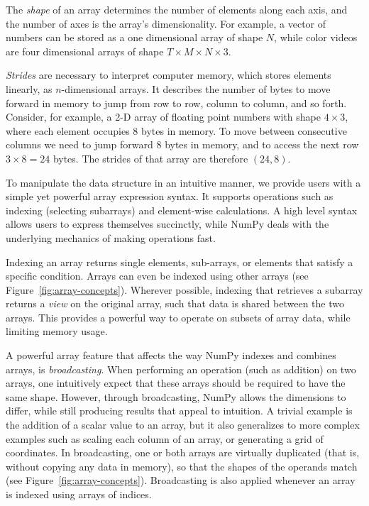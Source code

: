 The {\em shape} of an array determines the number of elements along each axis, and the number of axes is the array's dimensionality. For example, a vector of numbers can be stored as a one dimensional array of shape $N$, while color videos are four dimensional arrays of shape $T \times M \times N \times 3$.

{\em Strides} are necessary to interpret computer memory, which stores elements linearly, as $n$-dimensional arrays.  It describes the number of bytes to move forward in memory to jump from row to row, column to column, and so forth.  Consider, for example, a 2-D array of floating point numbers with shape $4 \times 3$, where each element occupies 8 bytes in memory.  To move between consecutive columns we need to jump forward 8 bytes in memory, and to access the next row $3 \times 8 = 24$ bytes.  The strides of that array are therefore $(24, 8)$.

To manipulate the data structure in an intuitive manner, we provide users with a simple yet powerful array expression syntax.  It supports operations such as indexing (selecting subarrays) and element-wise calculations.  A high level syntax allows users to express themselves succinctly, while NumPy deals with the underlying mechanics of making operations fast.

Indexing an array returns single elements, sub-arrays, or elements that satisfy a specific condition.  Arrays can even be indexed using other arrays (see Figure~\ref{fig:array-concepts}).  Wherever possible, indexing that retrieves a subarray returns a {\em view} on the original array, such that data is shared between the two arrays.  This provides a powerful way to operate on subsets of array data, while limiting memory usage.

A powerful array feature that affects the way NumPy indexes and combines arrays, is {\em broadcasting}. When performing an operation (such as addition) on two arrays, one intuitively expect that these arrays should be required to have the same shape.  However, through broadcasting, NumPy allows the dimensions to differ, while still producing results that appeal to intuition.  A trivial example is the addition of a scalar value to an array, but it also generalizes to more complex examples such as scaling each column of an array, or generating a grid of coordinates.  In broadcasting, one or both arrays are virtually duplicated (that is, without copying any data in memory), so that the shapes of the operands match (see Figure~\ref{fig:array-concepts}).  Broadcasting is also applied whenever an array is indexed using arrays of indices.%

